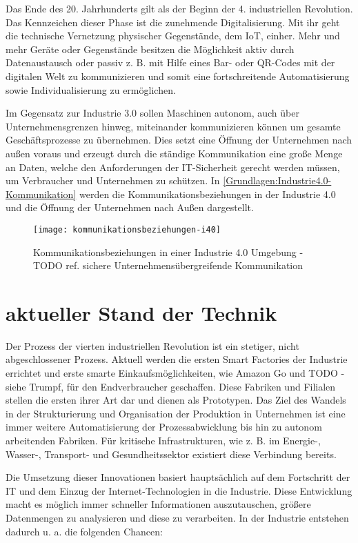 Das Ende des 20. Jahrhunderts gilt als der Beginn der 4. industriellen Revolution. Das Kennzeichen dieser Phase ist die zunehmende Digitalisierung. Mit ihr geht die technische Vernetzung physischer Gegenstände, dem \ac{IoT}, einher. Mehr und mehr Geräte oder Gegenstände besitzen die Möglichkeit aktiv durch Datenaustausch oder passiv z. B. mit Hilfe eines Bar- oder QR-Codes mit der digitalen Welt zu kommunizieren und somit eine fortschreitende Automatisierung sowie Individualisierung zu ermöglichen. 

Im Gegensatz zur Industrie 3.0 sollen Maschinen autonom, auch über Unternehmensgrenzen hinweg, miteinander kommunizieren können um gesamte Geschäftsprozesse zu übernehmen. Dies setzt eine Öffnung der Unternehmen nach außen voraus und erzeugt durch die ständige Kommunikation eine große Menge an Daten, welche den Anforderungen der IT-Sicherheit gerecht werden müssen, um Verbraucher und Unternehmen zu schützen. In \autoref{Grundlagen:Industrie4.0-Kommunikation} werden die Kommunikationsbeziehungen in der Industrie 4.0 und die Öffnung der Unternehmen nach Außen dargestellt.

\begin{figure}[h]
  \centering
  \texttt{[image: kommunikationsbeziehungen-i40]}
  \caption{Kommunikationsbeziehungen in einer Industrie 4.0 Umgebung - TODO ref. sichere Unternehmensübergreifende Kommunikation}
  \label{Grundlagen:Industrie4.0-Kommunikation}
\end{figure}

\clearpage

\section{aktueller Stand der Technik}
Der Prozess der vierten industriellen Revolution ist ein stetiger, nicht abgeschlossener Prozess. Aktuell werden die ersten Smart Factories der Industrie errichtet und erste smarte Einkaufsmöglichkeiten, wie Amazon Go und TODO - siehe Trumpf, für den Endverbraucher geschaffen. Diese Fabriken und Filialen stellen die ersten ihrer Art dar und dienen als Prototypen. Das Ziel des Wandels in der Strukturierung und Organisation der Produktion in Unternehmen ist eine immer weitere Automatisierung der Prozessabwicklung bis hin zu autonom arbeitenden Fabriken. Für kritische Infrastrukturen, wie z. B. im Energie-, Wasser-, Transport- und Gesundheitssektor existiert diese Verbindung bereits.

Die Umsetzung dieser Innovationen basiert hauptsächlich auf dem Fortschritt der \ac{IT} und dem Einzug der Internet-Technologien in die Industrie. Diese Entwicklung macht es möglich immer schneller Informationen auszutauschen, größere Datenmengen zu analysieren und diese zu verarbeiten. In der Industrie entstehen dadurch u. a. die folgenden Chancen:

